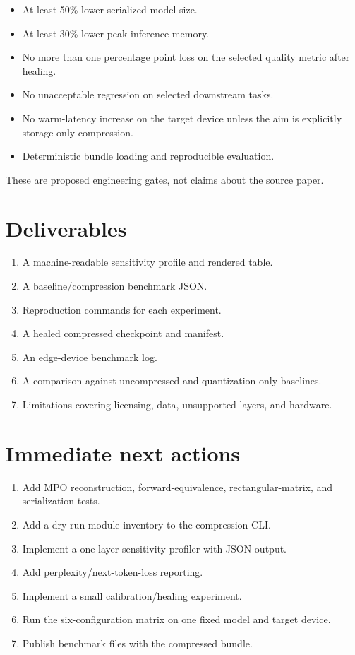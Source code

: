 \documentclass[11pt,a4paper]{article}
\begin{document}
\begin{itemize}[leftmargin=*]
  \item At least 50\% lower serialized model size.
  \item At least 30\% lower peak inference memory.
  \item No more than one percentage point loss on the selected quality metric
    after healing.
  \item No unacceptable regression on selected downstream tasks.
  \item No warm-latency increase on the target device unless the aim is
    explicitly storage-only compression.
  \item Deterministic bundle loading and reproducible evaluation.
\end{itemize}

These are proposed engineering gates, not claims about the source paper.

\section{Deliverables}

\begin{enumerate}[leftmargin=*]
  \item A machine-readable sensitivity profile and rendered table.
  \item A baseline/compression benchmark JSON.
  \item Reproduction commands for each experiment.
  \item A healed compressed checkpoint and manifest.
  \item An edge-device benchmark log.
  \item A comparison against uncompressed and quantization-only baselines.
  \item Limitations covering licensing, data, unsupported layers, and hardware.
\end{enumerate}

\section{Immediate next actions}

\begin{enumerate}[leftmargin=*]
  \item Add MPO reconstruction, forward-equivalence, rectangular-matrix, and
    serialization tests.
  \item Add a dry-run module inventory to the compression CLI.
  \item Implement a one-layer sensitivity profiler with JSON output.
  \item Add perplexity/next-token-loss reporting.
  \item Implement a small calibration/healing experiment.
  \item Run the six-configuration matrix on one fixed model and target device.
  \item Publish benchmark files with the compressed bundle.
\end{enumerate}
\end{document}
